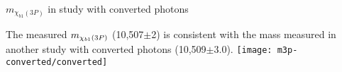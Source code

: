 \begin{frame}{$m_{\chi_{b1}(3P)}$ in study with  converted photons}
\begin{center}
The measured $m_{\chi_{b 1}(3P)}$ (10,507$\pm$2\mevcc) is consistent with the mass measured in another study with converted photons (10,509$\pm$3.0\mevcc).
\texttt{[image: m3p-converted/converted]}
\end{center}
\end{frame}
